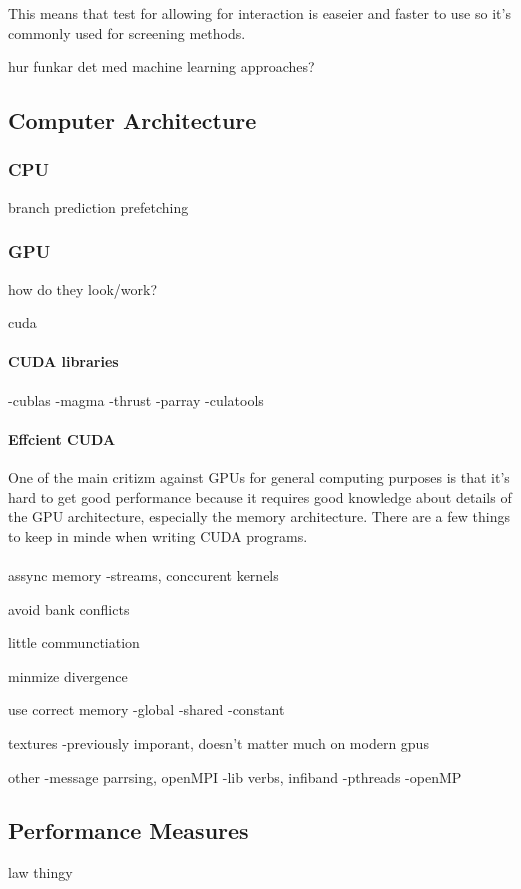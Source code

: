 \documentclass[10pt,a4paper]{article}
\begin{document}
This means that test for allowing for interaction is easeier and faster to use so it's commonly used for screening methods. 

hur funkar det med machine learning approaches?

\clearpage
\subsection{Computer Architecture}

\subsubsection{CPU}
branch prediction
prefetching

\subsubsection{GPU}
how do they look/work?

cuda\cite{cuda}

\paragraph{CUDA libraries}
-cublas
-magma
-thrust
-parray
-culatools

\paragraph{Effcient CUDA}
One of the main critizm against GPUs for general computing purposes is that it's hard to get good performance because it requires good knowledge about details of the GPU architecture, especially the memory architecture. There are a few things to keep in minde when writing CUDA programs.\\
\\
assync memory
-streams, conccurent kernels

avoid bank conflicts

little communctiation

minmize divergence

use correct memory
-global
-shared
-constant

textures
-previously imporant, doesn't matter much on modern gpus

other
-message parrsing, openMPI
-lib verbs, infiband
-pthreads
-openMP

\cite{cuda, cuda_best_practice}

\subsection{Performance Measures}
law thingy
\end{document}
